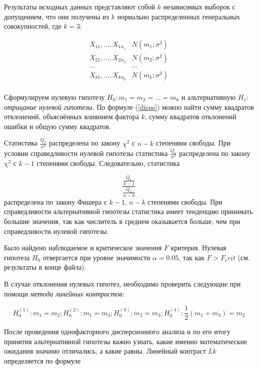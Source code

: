 Результаты исходных данных представляют собой $k$ независимых выборок с допущением, что они получены из $k$ нормально распределенных генеральных совокупностей, где $k=3$:

\begin{equation}
	\begin{matrix}
		X_{11}, \ldots, X_{1n_1} & N(m_1; \sigma^2) \\
		X_{21}, \ldots, X_{2n_2} & N(m_2; \sigma^2) \\
		\ldots & \ldots \\
		X_{k1}, \ldots, X_{kn_k} & N(m_k; \sigma^2) \\
	\end{matrix}
\end{equation}

Сформулируем нулевую гипотезу $H_0: m_1 = m_2 = \ldots = m_k$ и альтернативную $H_1:$ \textit{отрицание нулевой гипотезы}. По формуле (\ref{disps}) можно найти сумму квадратов отклонений, объяснённых влиянием фактора $k$, сумму квадратов отклонений ошибки и общую сумму квадратов.

Статистика $\frac{Q_2}{\sigma^2}$ распределена по закону $\chi^2$ с $n - k$ степенями свободы. При условии справедливости нулевой гипотезы статистика $\frac{Q_1}{\sigma^2}$ распределена по закону $\chi^2$ с $k - 1$ степенями свободы. Следовательно, статистика

\begin{equation}
	\frac{\frac{Q_1}{k - 1}}{\frac{Q_2}{n - k}}
\end{equation}
распределена по закону Фишера с $k - 1$, $n - k$ степенями свободы. При справедливости альтернативной гипотезы статистика имеет тенденцию принимать большие значения, так как числитель в среднем оказывается больше, чем при справедливости нулевой гипотезы.

Было найдено наблюдаемое и критическое значения $F$ критерия. Нулевая гипотеза $H_0$ отвергается при уровне значимости $\alpha = 0.05$, так как $F > F_crit$ (см. результаты в конце файла).

В случае отклонения нулевых гипотез, необходимо проверить следующие при помощи \textit{метода линейных контрастов}:

\begin{equation}\label{H0}
	H^{(1)}_0: m_1 = m_2; H^{(2)}_0: m_1 = m_3; H^{(3)}_0: m_2 = m_3; H^{(4)}_0: \frac{1}{2} (m_1 + m_3) = m_2
\end{equation}

После проведения однофакторного дисперсионного анализа и по его итогу принятия альтернативной гипотезы важно узнать, какие именно математические ожидания значимо отличались, а какие равны. Линейный контраст $Lk$ определяется по формуле

